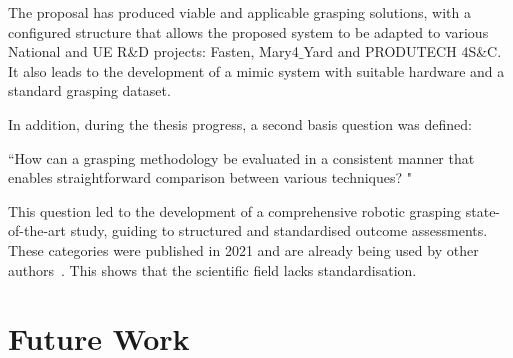 The proposal has produced viable and applicable grasping solutions, with a configured structure that allows the proposed system to be adapted to various National and UE R\&D projects: Fasten, Mary4$\_$Yard and PRODUTECH 4S\&C. It also leads to the development of a mimic system with suitable hardware and a standard grasping dataset.

In addition, during the thesis progress, a second basis question was defined:

\begin{flushright}
	``How can a grasping methodology be evaluated in a consistent manner that enables straightforward comparison between various techniques? "
\end{flushright} 

This question led to the development of a comprehensive robotic grasping state-of-the-art study, guiding to structured and standardised outcome assessments. These categories were published in 2021 and are already being used by other authors~\cite{hu2022grasps}. This shows that the scientific field lacks standardisation.



\section{Future Work}

